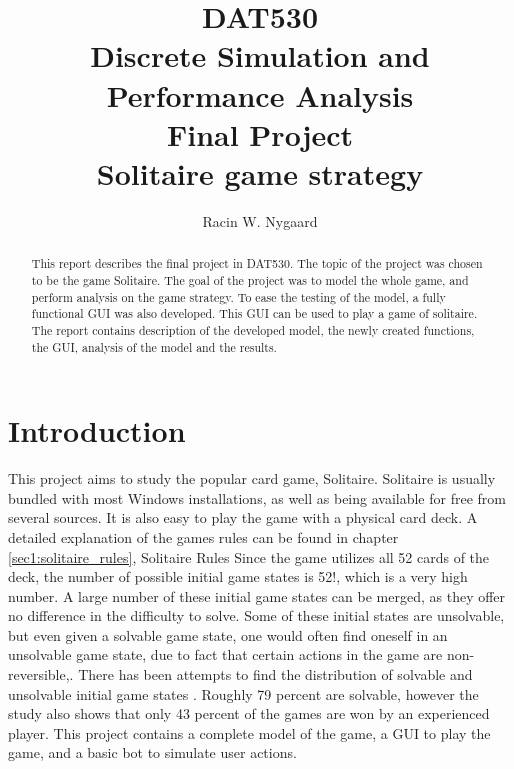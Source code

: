 \documentclass[runningheads,a4paper]{llncs}
\begin{document}
\mainmatter  %
\title{DAT530\\Discrete Simulation and Performance Analysis\\Final Project\\Solitaire game strategy}
\author{Racin W. Nygaard}

\tocauthor{ }
\maketitle
	


\begin{abstract}
This report describes the final project in DAT530. The topic of the project was chosen to be the game Solitaire. The goal of the project was to model the whole game, and perform analysis on the game strategy. To ease the testing of the model, a fully functional GUI was also developed. This GUI can be used to play a game of solitaire. The report contains description of the developed model, the newly created functions, the GUI, analysis of the model and the results.

\end{abstract}

\setcounter{tocdepth}{3}
\setcounter{secnumdepth}{3}

\tableofcontents
\listoffigures
\listoftables
\printacronyms[name=Abbreviations,include-classes=abbrev]
\printacronyms[name=Nomenclature,include-classes=nomencl]
\section{Introduction}
This project aims to study the popular card game, Solitaire. Solitaire is usually bundled with most Windows installations, as well as being available for free from several sources. It is also easy to play the game with a physical card deck. A detailed explanation of the games rules can be found in chapter \ref{sec1:solitaire_rules}, Solitaire Rules
\newline
Since the game utilizes all 52 cards of the deck, the number of possible initial game states is 52!, which is a very high number. A large number of these initial game states can be merged, as they offer no difference in the difficulty to solve. Some of these initial states are unsolvable, but even given a solvable game state, one would often find oneself in an unsolvable game state, due to fact that certain actions in the game are non-reversible,. There has been attempts to find the distribution of solvable and unsolvable initial game states \cite{introduction}. Roughly 79 percent are solvable, however the study also shows that only 43 percent of the games are won by an experienced player.
\newline
This project contains a complete model of the game, a GUI to play the game, and a basic bot to simulate user actions. 
\end{document}
